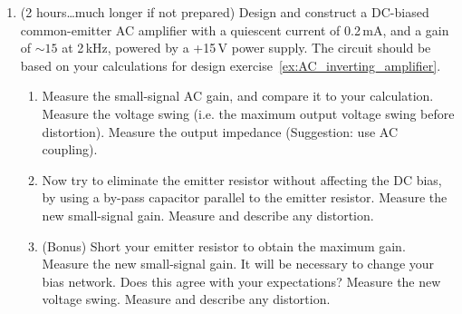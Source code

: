 \documentclass{article}
\begin{document}
\begin{enumerate}

\item (2 hours\ldots much longer if not prepared) Design and construct a DC-biased common-emitter AC amplifier with a quiescent current of 0.2\,mA, and a gain of $\sim 15$ at 2\,kHz, powered by a +15\,V power supply.  The circuit should be based on your calculations for design exercise~\ref{ex:AC_inverting_amplifier}.
\begin{enumerate}
\item Measure the small-signal AC gain, and compare it to your calculation. Measure the voltage swing (i.e. the maximum output voltage swing before distortion). Measure the output impedance (Suggestion: use AC coupling).
\item Now try to eliminate the emitter resistor without affecting the DC bias, by using a by-pass capacitor parallel to the emitter resistor. Measure the new small-signal gain. Measure and describe any distortion.
\item (Bonus) Short your emitter resistor to obtain the maximum gain. Measure the new small-signal gain. It will be necessary to change your bias network. Does this agree with your expectations? Measure the new voltage swing. Measure and describe any distortion. 
\end{enumerate}

\end{enumerate}
\end{document}
